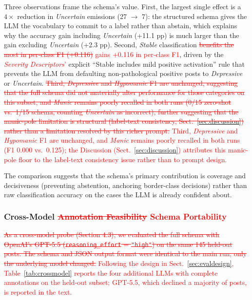 \documentclass[runningheads]{llncs}
\newcommand{\rev}[1]{\textcolor{red}{#1}}
\newcommand{\del}[1]{\textcolor{red}{\sout{#1}}}
\newcommand{\rev}[1]{#1}
\newcommand{\del}[1]{}
\begin{document}
Three observations frame the schema's value. First, the largest single effect is a $4\times$ reduction in \emph{Uncertain} emissions (27 $\rightarrow$ 7): the structured schema gives the LLM the vocabulary to commit to a label rather than abstain, which explains why the accuracy gain including \emph{Uncertain} (+11.1 pp) is much larger than the gain excluding \emph{Uncertain} (+2.3 pp). Second, \emph{Stable} classification \del{benefits the most in per-class F1 (+0.116)} \rev{gains +0.116 in per-class F1}, driven by the \rev{\emph{Severity Descriptors}'} explicit ``Stable includes mild positive activation'' rule that prevents the LLM from defaulting non-pathological positive posts to \emph{Depressive} or \emph{Uncertain}. \del{Third, \emph{Depressive} and \emph{Hypomanic} F1 are unchanged, suggesting that the full schema did not materially alter performance for those categories on this subset, and \emph{Manic} remains poorly recalled in both runs (0/15 zero-shot vs.~1/15 schema, counting \emph{Uncertain} as incorrect), further suggesting that the manic-pole limitation is structural (label-text consistency, Sect.~\ref{sec:discussion}) rather than a limitation resolved by this richer prompt.} \rev{Third, \emph{Depressive} and \emph{Hypomanic} F1 are unchanged, and \emph{Manic} remains poorly recalled in both runs (F1 0.000 vs.~0.125); the Discussion (Sect.~\ref{sec:discussion}) attributes this manic-pole floor to the label-text consistency issue rather than to prompt design.}

The comparison suggests that the schema's primary contribution is coverage and decisiveness (preventing abstention, anchoring border-class decisions) rather than raw classification accuracy on the cases the LLM is already confident about.

\subsubsection{Cross-Model \del{Annotation Feasibility} \rev{Schema Portability}}
\label{sec:crossmodel}
\del{As a cross-model probe (Section 4.3), we evaluated the full schema with OpenAI's GPT-5.5 (\texttt{reasoning\_effort} = \texttt{"high"}) on the same 145 held-out posts. The schema and JSON output format were identical to the main run; only the underlying model changed.} \rev{Following the design in Sect.~\ref{sec:evaldesign}, Table~\ref{tab:crossmodel} reports the four additional LLMs with complete annotations on the held-out subset; GPT-5.5, which declined a majority of posts, is reported in the text.}
\end{document}
